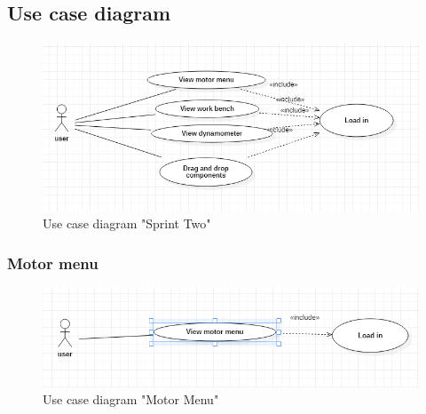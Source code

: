 \documentclass[]{report}
\begin{document}
\subsection{Use case diagram}
\begin{figure}[H]
		\includegraphics[scale=0.9, frame]{sprintTwoUseCase.png}
	\caption{Use case diagram "Sprint Two"}
	\end{figure}

\subsubsection{Motor menu}
\begin{figure}[H]
	\includegraphics[scale=0.9, frame]{motorMenuUseCase.png}
	\caption{Use case diagram "Motor Menu"}
	\end{figure}
\end{document}
